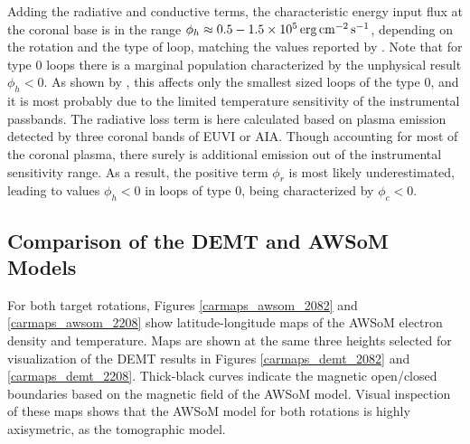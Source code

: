 \documentclass[namedreferences]{solarphysics}
\newcommand{\cm}{{\rm cm}}
\newcommand{\cminvs}{\cm^{-2}}
\newcommand{\erg}{{\rm erg}}
\newcommand{\s}{{\rm s}}
\begin{document}
\begin{article}
{{Adding the} radiative and conductive terms, the characteristic energy input flux at the coronal base is in the range $\phi_h\approx 0.5-1.5 \times 10^5\,\erg\,\cminvs\,\s^{-1}$, depending on the rotation and the type of {loop, matching the values reported by} \citet{maccormack_2017}. Note that for type 0 loops there is a marginal population characterized by the unphysical result $\phi_h<0$. As shown by \citet{maccormack_2017}, {this affects only the smallest sized loops of the type 0}, and it is {most probably} due to the limited temperature sensitivity of the instrumental passbands. The radiative loss term is {here calculated based on plasma emission detected by three coronal bands of EUVI or AIA. Though accounting for most of the coronal plasma, there surely is additional emission out of the instrumental sensitivity range. As a result,} the positive term $\phi_r$ is most likely underestimated, leading to values $\phi_h<0$ in loops of type 0, {being characterized by $\phi_c<0$.}}

\subsection{{Comparison of the DEMT and AWSoM Models}}\label{awsom_res} 

{For both target rotations,} Figures \ref{carmaps_awsom_2082} and \ref{carmaps_awsom_2208} show latitude-longitude maps of the AWSoM electron density and temperature. {Maps are shown} at the same three heights selected for visualization of the DEMT results in Figures \ref{carmaps_demt_2082} and \ref{carmaps_demt_2208}. {Thick-black curves} indicate the magnetic open/closed boundaries based on the magnetic field of the AWSoM model. Visual inspection of these maps shows that the AWSoM model for both rotations is highly {axisymetric}, as the tomographic model.


\end{article}
\end{document}
